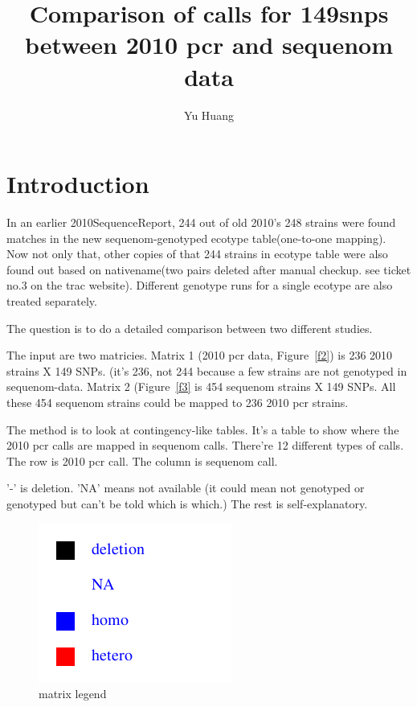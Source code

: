\documentclass[a3paper,10pt]{article}
\title{Comparison of calls for 149snps between 2010 pcr and sequenom data}
\author{Yu Huang}
\begin{document}
\maketitle

\begin{abstract}

\end{abstract}

\tableofcontents


\section{Introduction}
In an earlier 2010SequenceReport, 244 out of old 2010's 248 strains were found matches in the new sequenom-genotyped ecotype table(one-to-one mapping). Now not only that, other copies of that 244 strains in ecotype table were also found out based on nativename(two pairs deleted after manual checkup. see ticket no.3 on the trac website). Different genotype runs for a single ecotype are also treated separately.

The question is to do a detailed comparison between two different studies.

The input are two matricies. Matrix 1 (2010 pcr data, Figure~\ref{f2}) is 236 2010 strains X 149 SNPs. (it's 236, not 244 because a few strains are not genotyped in sequenom-data. Matrix 2 (Figure~\ref{f3} is 454 sequenom strains X 149 SNPs. All these 454 sequenom strains could be mapped to 236 2010 pcr strains.

The method is to look at contingency-like tables. It's a table to show where the 2010 pcr calls are mapped in sequenom calls. There're 12 different types of calls. The row is 2010 pcr call. The column is sequenom call.

'-' is deletion. 'NA' means not available (it could mean not genotyped or genotyped but can't be told which is which.) The rest is self-explanatory.

\begin{figure}
\includegraphics{figures/2010pcr_with_sequenom_149snps_accession2ecotype_complete_y3_legend.png}
\caption{matrix legend}\label{f1}
\end{figure}
\end{document}

